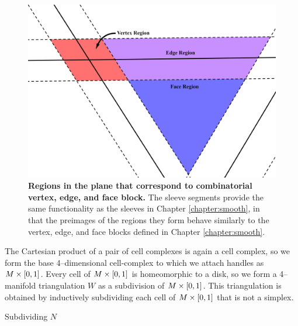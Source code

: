 
\begin{figure}[h!]
	\centering
	\includegraphics[width=\textwidth]{figures/pl-regions.png}
	\caption{
		\textbf{Regions in the plane that correspond to combinatorial vertex, edge, and face block.}
		The sleeve segments provide the same functionality as the sleeves in Chapter \ref{chapter:smooth}, in that the preimages of the regions they form behave similarly to the vertex, edge, and face blocks defined in Chapter \ref{chapter:smooth}.
	}
	\label{fig:pl-regions}
\end{figure}

The Cartesian product of a pair of cell complexes is again a cell complex, so we form the base 4--dimensional cell-complex to which we attach handles as $M\times[0,1]$.
Every cell of $M\times[0,1]$ is homeomorphic to a disk, so we form a 4--manifold triangulation $W$ as a subdivision of $M\times[0,1]$.
This triangulation is obtained by inductively subdividing each cell of $M\times[0,1]$ that is not a simplex.

\begin{algorithm}[h!]
	\caption{Subdividing $N$}
	\label{alg:subdividing-manifold}
\end{algorithm}

